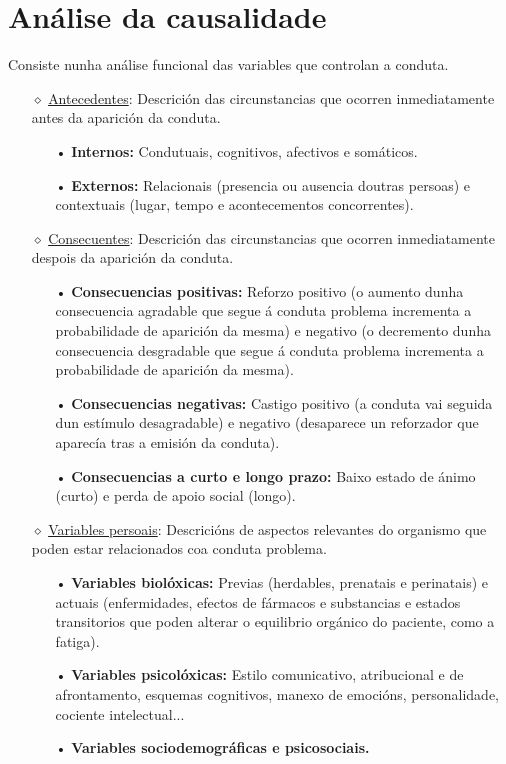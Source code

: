 \documentclass[a4paper,11pt]{article}
\begin{document}
\section{Análise da causalidade}
Consiste nunha análise funcional das variables que controlan a conduta.
\begin{itemize}
	\item[$\diamond$] \underline{Antecedentes}: Descrición das circunstancias que ocorren 
	inmediatamente antes da aparición da conduta. 
	\begin{itemize}
		\item[•] \textbf{Internos:} Condutuais, cognitivos, afectivos e somáticos.
		\item[•] \textbf{Externos:} Relacionais (presencia ou ausencia doutras persoas) e contextuais 
		(lugar, tempo e acontecementos concorrentes). 
	\end{itemize}
	\item[$\diamond$] \underline{Consecuentes}: Descrición das circunstancias que ocorren 
	inmediatamente despois da aparición da conduta. 
	\begin{itemize}
		\item[•] \textbf{Consecuencias positivas:} Reforzo positivo (o aumento dunha consecuencia 
		agradable que segue á conduta problema incrementa a probabilidade de aparición da mesma) e 
		negativo (o decremento dunha consecuencia desgradable que segue á conduta problema incrementa 
		a probabilidade de aparición da mesma).
		\item[•] \textbf{Consecuencias negativas:} Castigo positivo (a conduta vai seguida dun 
		estímulo desagradable) e negativo (desaparece un reforzador que aparecía tras a emisión da 
		conduta).
		\item[•] \textbf{Consecuencias a curto e longo prazo:} Baixo estado de ánimo (curto) e perda 
		de apoio social (longo).
	\end{itemize}
	\item[$\diamond$] \underline{Variables persoais}: Descricións de aspectos relevantes do organismo 
	que poden estar relacionados coa conduta problema. 
	\begin{itemize}
		\item[•] \textbf{Variables biolóxicas:} Previas (herdables, prenatais e perinatais) e actuais 
		(enfermidades, efectos de fármacos e substancias e estados transitorios que poden alterar o 
		equilibrio orgánico do paciente, como a fatiga). 
		\item[•] \textbf{Variables psicolóxicas:} Estilo comunicativo, atribucional e de 
		afrontamento, esquemas cognitivos, manexo de emocións, personalidade, cociente intelectual...
		\item[•] \textbf{Variables sociodemográficas e psicosociais.}
	\end{itemize}
\end{itemize}
\end{document}
